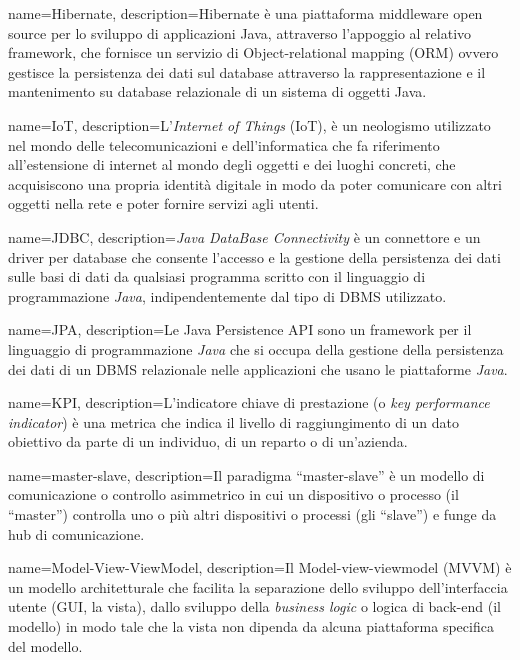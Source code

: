 {
    name=Hibernate,
    description={Hibernate è una piattaforma middleware open source per lo sviluppo di applicazioni Java, attraverso l'appoggio al relativo framework, che fornisce un servizio di Object-relational mapping (ORM) ovvero gestisce la persistenza dei dati sul database attraverso la rappresentazione e il mantenimento su database relazionale di un sistema di oggetti Java.}
}

{
    name=IoT,
    description={L'\textit{Internet of Things} (IoT), è un neologismo utilizzato nel mondo delle telecomunicazioni e dell'informatica che fa riferimento all'estensione di internet al mondo degli oggetti e dei luoghi concreti, che acquisiscono una propria identità digitale in modo da poter comunicare con altri oggetti nella rete e poter fornire servizi agli utenti.}
}

{
    name=JDBC,
    description={\textit{Java DataBase Connectivity} è un connettore e un driver per database che consente l'accesso e la gestione della persistenza dei dati sulle basi di dati da qualsiasi programma scritto con il linguaggio di programmazione \textit{Java}, indipendentemente dal tipo di DBMS utilizzato.}
}

{
    name=JPA,
    description={Le Java Persistence API sono un framework per il linguaggio di programmazione \textit{Java} che si occupa della gestione della persistenza dei dati di un DBMS relazionale nelle applicazioni che usano le piattaforme \textit{Java}.}
}

{
    name=KPI,
    description={L’indicatore chiave di prestazione (o \textit{key performance indicator}) è una metrica che indica il livello di raggiungimento di un dato obiettivo da parte di un individuo, di un reparto o di un’azienda.}
}

{
    name=master-slave,
    description={Il paradigma ``master-slave'' è un modello di comunicazione o controllo asimmetrico in cui un dispositivo o processo (il ``master'') controlla uno o più altri dispositivi o processi (gli ``slave'') e funge da hub di comunicazione.}
}

{
    name=Model-View-ViewModel,
    description={Il Model-view-viewmodel (MVVM) è un modello architetturale che facilita la separazione dello sviluppo dell'interfaccia utente (GUI, la vista), dallo sviluppo della \textit{business logic} o logica di back-end (il modello) in modo tale che la vista non dipenda da alcuna piattaforma specifica del modello.}
}

